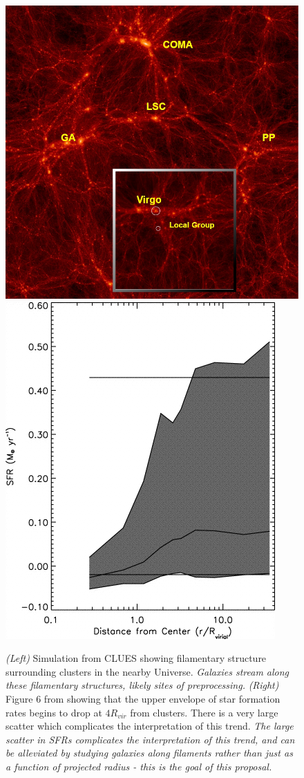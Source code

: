 \documentclass[11pt, preprint]{aastex}
\begin{document}
\begin{figure}[h]
   \centering
 \includegraphics[width=.48\textwidth]{CLUES-DM.png}
\includegraphics[width=.39\textwidth]{gomez2003-fg6a.png}
   \caption{\small  {\it (Left) } Simulation from CLUES showing
     filamentary structure surrounding clusters in the nearby
     Universe.  {\it Galaxies stream along these filamentary structures, likely sites of preprocessing.}
{\it (Right)}  Figure 6 from \citet{gomez03} showing that the upper
envelope of star formation rates begins to drop at $4R_{vir}$ from clusters.  There is a very
large scatter which complicates the interpretation of this trend.   
{\it The large scatter in SFRs complicates the interpretation of this trend, and can be alleviated by studying galaxies along
filaments rather than just as a function of projected radius - this is the goal of this proposal.}}
     \label{fig1}
 \end{figure}
%
%
\end{document}
